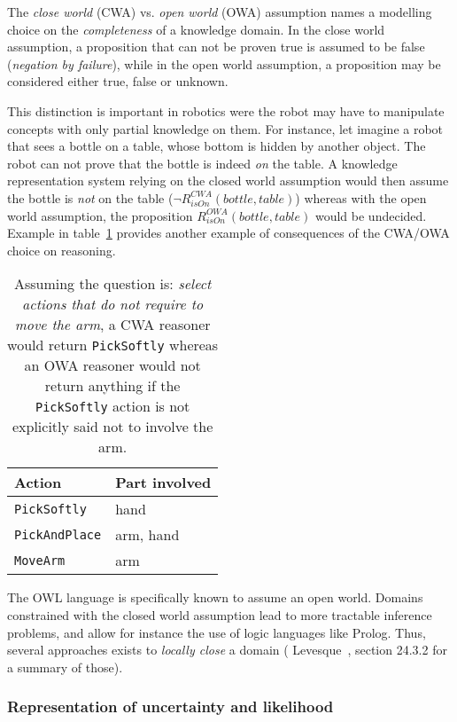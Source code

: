 The \emph{close world} (CWA) vs. \emph{open world} (OWA) assumption names a
modelling choice on the \emph{completeness} of a knowledge domain. In the close
world assumption, a proposition that can not be proven true is assumed to be
false (\emph{negation by failure}), while in the open world assumption, a
proposition may be considered either true, false or unknown.

This distinction is important in robotics were the robot may have to manipulate
concepts with only partial knowledge on them. For instance, let imagine a robot
that sees a bottle on a table, whose bottom is hidden by another object. The
robot can not prove that the bottle is indeed \emph{on} the table. A knowledge
representation system relying on the closed world assumption would then assume
the bottle is \emph{not} on the table ($\lnot R^{CWA}_{isOn}(bottle, table)$)
whereas with the open world assumption, the proposition $R^{OWA}_{isOn}(bottle,
table)$ would be undecided. Example in table~\ref{table|cwa-owa-example} provides
another example of consequences of the CWA/OWA choice on reasoning.

\begin{table}
    \begin{center}
    \begin{tabular}{ll}
    {\bf Action} & {\bf Part involved} \\
    \hline
    {\tt PickSoftly} & hand \\
    {\tt PickAndPlace} & arm, hand \\
    {\tt MoveArm} & arm \\
    \hline
    \end{tabular}
    \end{center}
    \caption{Assuming the question is: \emph{select actions that do not require
    to move the arm}, a CWA reasoner would return {\tt PickSoftly} whereas an
    OWA reasoner would not return anything if the {\tt PickSoftly} action is
    not explicitly said not to involve the arm.}
    \label{table|cwa-owa-example}
\end{table}

The OWL language is specifically known to assume an open world.  Domains
constrained with the closed world assumption lead to more tractable inference
problems, and allow for instance the use of logic languages like Prolog. Thus,
several approaches exists to \emph{locally close} a domain (\cf
Levesque~\cite{Levesque2008}, section 24.3.2 for a summary of those).

\subsubsection{Representation of uncertainty and likelihood}

